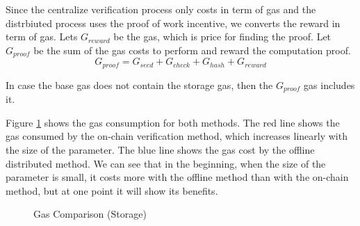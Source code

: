 \documentclass[runningheads]{llncs}
\begin{document}
Since the centralize verification process only costs in term of gas and the distrbiuted process uses the proof of work incentive, we converts the reward in term of gas. Lets $G_{reward}$ be the gas, which is price for finding the proof. Let \( G_{proof} \) be the sum of the gas costs to perform and reward the  computation proof. 
\[
G_{proof} = G_{seed} + G_{check} + G_{hash} + G_{reward} 
\]

In case the base gas does not contain the storage gas, then the \( G_{proof} \) gas includes it.

Figure \ref{fig:gas_compare} shows the gas consumption for both methods. The red line shows the gas consumed by the on-chain verification method, which increases linearly with the size of the parameter. The blue line shows the gas cost by the offline distributed method. We can see that in the beginning, when the size of the parameter is small, it costs more with the offline method than with the on-chain method, but at one point it will show its benefits.

\begin{figure}
  \centering
  \caption{Gas Comparison (Storage)}
  \label{fig:gas_compare}
\end{figure}
\end{document}
